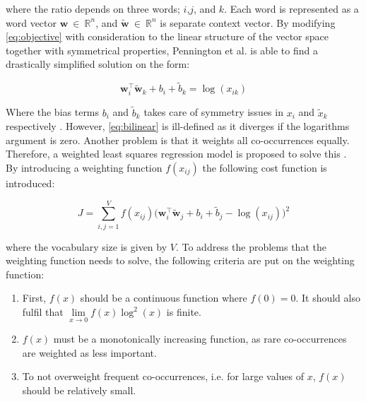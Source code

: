 \noindent where the ratio depends on three words; $i$,$j$, and $k$. Each word is represented as a word vector $\boldsymbol{w}\ \in\ \mathbb{R}^n$, and $\boldsymbol{\tilde{w}}\ \in\ \mathbb{R}^n$ is separate context vector. By modifying \autoref{eq:objective} with consideration to the linear structure of the vector space together with symmetrical properties, Pennington et al. \cite{pennington2014glove} is able to find a drastically simplified solution on the form:

\begin{equation}
    \boldsymbol{w}^{\top}_{i}\tilde{\boldsymbol{w}}_k + b_i + \tilde{b}_k = \log(x_{ik})
    \label{eq:bilinear}
\end{equation}

\noindent Where the bias terms $b_i$ and $\tilde{b}_k$ takes care of symmetry issues in $x_i$ and $\tilde{x}_k$ respectively \cite{pennington2014glove}. However, \autoref{eq:bilinear} is ill-defined as it diverges if the logarithms argument is zero. Another problem is that it weights all co-occurrences equally. Therefore, a weighted least squares regression model is proposed to solve this \cite{pennington2014glove}. By introducing a weighting function $f(x_{ij})$ the following cost function is introduced:

\begin{equation}
    J = \sum^{V}_{i,j=1}f(x_{ij})\Big( \boldsymbol{w}^{\top}_i\tilde{\boldsymbol{w}}_j + b_i + \tilde{b}_j - \log(x_{ij}) \Big)^2
\end{equation}

where the vocabulary size is given by $V$. To address the problems that the weighting function needs to solve, the following criteria are put on the weighting function:

\begin{enumerate}[label=\roman*.,leftmargin=4em,align=left]
    \item First, $f(x)$ should be a continuous function where $f(0) = 0$. It should also fulfil that $\lim\limits_{x \to 0} f(x)\log^2(x)$ is finite.
    
    \item $f(x)$ must be a monotonically increasing function, as rare co-occurrences are weighted as less important.
    
    \item To not overweight frequent co-occurrences, i.e. for large values of $x$, $f(x)$ should be relatively small. 
    
\end{enumerate}

